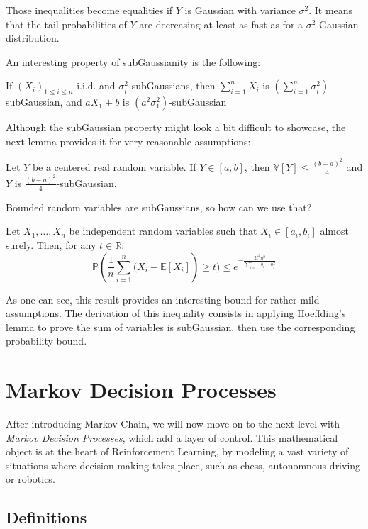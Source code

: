 Those inequalities become equalities if $Y$ is Gaussian with variance $\sigma^2$. It means that the tail probabilities of $Y$ are decreasing at least as fast as for a $\sigma^2$ Gaussian distribution.

An interesting property of subGaussianity is the following:
\begin{thm}
  If $(X_i)_{1 \leq i \leq n}$ i.i.d. and $\sigma_i^2$-subGaussians, then $\sum_{i=1}^n X_i$ is $(\sum_{i=1}^n \sigma_i^2)$-subGaussian, and $aX_1 + b$ is $(a^2\sigma_1^2)$-subGaussian
\end{thm}

Although the subGaussian property might look a bit difficult to showcase, the next lemma provides it for very reasonable assumptions:

\begin{lem}
  Let $Y$ be a centered real random variable. If $Y \in [a, b]$, then $\mathbb{V}[Y] \leq \frac{(b - a)^2}{4}$ and $Y$ is $\frac{(b-a)^2}{4}$-subGaussian.
\end{lem}

Bounded random variables are subGaussians, so how can we use that?

\begin{thm}
  Let $X_1, \dots, X_n$ be independent random variables such that $X_i \in [a_i, b_i]$ almost surely. Then, for any $t \in \mathbb{R}$:
  $$\mathbb{P}\left(\frac{1}{n} \sum_{i=1}^n (X_i - \mathbb{E}[X_i]\right) \geq t) \leq e^{-\frac{2 t^2 n^2}{\sum_{i=1}^n (b_i - a_i^2}}$$
\end{thm}

As one can see, this result provides an interesting bound for rather mild assumptions. The derivation of this inequality consists in applying Hoeffding's lemma to prove the sum of variables is subGaussian, then use the corresponding probability bound.

\section{Markov Decision Processes}
\label{section:MDP}

After introducing Markov Chain, we will now move on to the next level with \emph{Markov Decision Processes}, which add a layer of control. This mathematical object is at the heart of Reinforcement Learning, by modeling a vast variety of situations where decision making takes place, such as chess, autonomnous driving or robotics.

\subsection{Definitions}
\label{subsec:MDP-defs}

